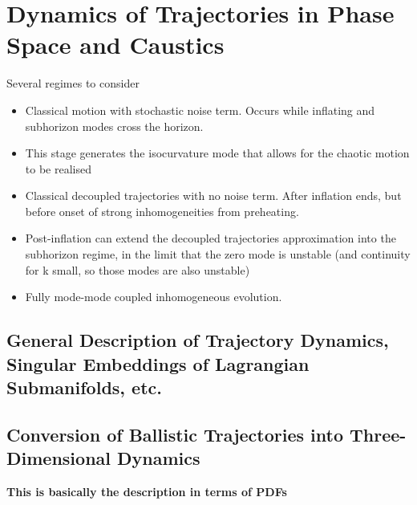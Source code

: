 \section{Dynamics of Trajectories in Phase Space and Caustics}
Several regimes to consider
\begin{itemize}
\item Classical motion with stochastic noise term.  Occurs while inflating and subhorizon modes cross the horizon.
\item This stage generates the isocurvature mode that allows for the chaotic motion to be realised
\item Classical decoupled trajectories with no noise term.  After inflation ends, but before onset of strong inhomogeneities from preheating.
\item Post-inflation can extend the decoupled trajectories approximation into the subhorizon regime, in the limit that the zero mode is unstable (and continuity for k small, so those modes are also unstable)
\item Fully mode-mode coupled inhomogeneous evolution.
\end{itemize}

\subsection{General Description of Trajectory Dynamics, Singular Embeddings of Lagrangian Submanifolds, etc.}

\subsection{Conversion of Ballistic Trajectories into Three-Dimensional Dynamics}
{\bf This is basically the description in terms of PDFs}
